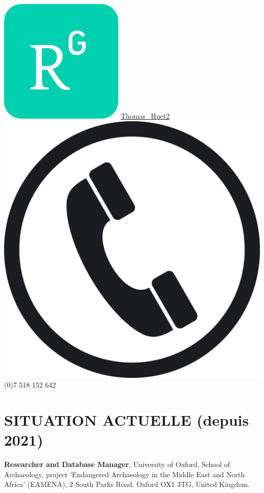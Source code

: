 \documentclass{article}
\newcommand{\fr}[1]{#1}       %
\newcommand{\en}[1]{}     %
\begin{document}
\includegraphics[scale=0.050]{rgate} \quad \href{https://www.researchgate.net/profile/Thomas\_Huet2}{Thomas\_Huet2} \\
\includegraphics[scale=0.005]{phone} \quad  {} (0)7 518 152 642 \\


\section{\fr{SITUATION ACTUELLE (depuis 2021)}\en{CURRENT SITUATION (since 2021)}}
\textbf{Researcher and Database Manager}, University of Oxford, School of Archaeology, project 'Endangered Archaeology in the Middle East and North Africa' (EAMENA), 2 South Parks Road, Oxford OX1 3TG, United Kingdom.
\end{document}
